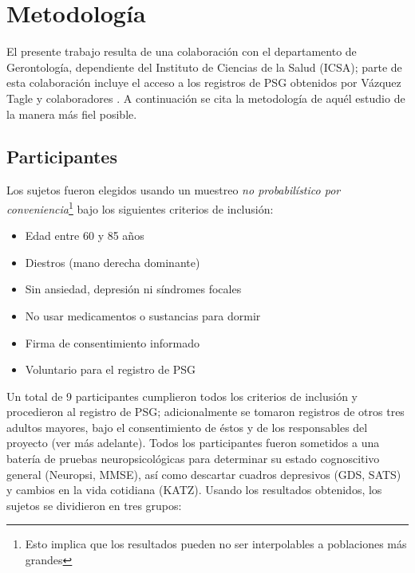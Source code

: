 
\chapter{Metodología}

El presente trabajo resulta de una colaboración con el departamento de Gerontología, dependiente 
del Instituto de Ciencias de la Salud (ICSA); parte de esta colaboración incluye el acceso a los 
registros de PSG obtenidos por Vázquez Tagle y colaboradores \cite{VazquezTagle16}. 
A continuación se cita la metodología de aquél estudio de la manera más fiel posible.

\section{Participantes}

Los sujetos fueron elegidos usando un muestreo \textit{no probabilístico por 
conveniencia}\footnote{Esto implica que los resultados pueden  no ser interpolables a poblaciones 
más grandes} bajo los siguientes criterios de inclusión:
\begin{itemize}
\item Edad entre 60 y 85 años
\item Diestros (mano derecha dominante)
\item Sin ansiedad, depresión ni síndromes focales
\item No usar medicamentos o sustancias para dormir
\item Firma de consentimiento informado
\item Voluntario para el registro de PSG
\end{itemize}

Un total de 9 participantes cumplieron todos los criterios de inclusión y procedieron al registro 
de PSG; adicionalmente se tomaron registros de otros tres adultos mayores, bajo el consentimiento 
de éstos y de los responsables del proyecto (ver más adelante).
%
Todos los participantes fueron sometidos a una batería de pruebas neuropsicológicas para determinar
su estado cognoscitivo general (Neuropsi, MMSE), así como descartar cuadros depresivos (GDS, SATS) 
y cambios en la vida cotidiana (KATZ).
Usando los resultados obtenidos, los sujetos se dividieron en tres grupos:

